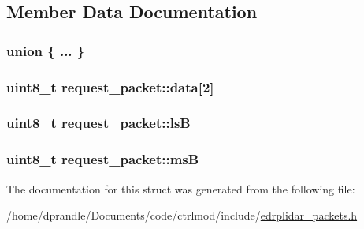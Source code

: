 \subsection{Member Data Documentation}
\hypertarget{structrequest__packet_a7f612f9825a53cf4f1440eb566a1bff2}{\subsubsection[{"@29}]{\setlength{\rightskip}{0pt plus 5cm}union \{ ... \} }}\label{structrequest__packet_a7f612f9825a53cf4f1440eb566a1bff2}
\hypertarget{structrequest__packet_aa491a1d59ef4c4b2d40575569e9c5e2d}{
\subsubsection[{data}]{\setlength{\rightskip}{0pt plus 5cm}uint8\-\_\-t request\-\_\-packet\-::data\mbox{[}2\mbox{]}}}\label{structrequest__packet_aa491a1d59ef4c4b2d40575569e9c5e2d}
\hypertarget{structrequest__packet_a8acbd68bdbd185926f3a4addb920488b}{
\subsubsection[{ls\-B}]{\setlength{\rightskip}{0pt plus 5cm}uint8\-\_\-t request\-\_\-packet\-::ls\-B}}\label{structrequest__packet_a8acbd68bdbd185926f3a4addb920488b}
\hypertarget{structrequest__packet_a5b313981d2e1b5d5966b0e76df27f2a1}{
\subsubsection[{ms\-B}]{\setlength{\rightskip}{0pt plus 5cm}uint8\-\_\-t request\-\_\-packet\-::ms\-B}}\label{structrequest__packet_a5b313981d2e1b5d5966b0e76df27f2a1}


The documentation for this struct was generated from the following file\-:\begin{DoxyCompactItemize}
\item 
/home/dprandle/\-Documents/code/ctrlmod/include/\hyperlink{edrplidar__packets_8h}{edrplidar\-\_\-packets.\-h}\end{DoxyCompactItemize}
